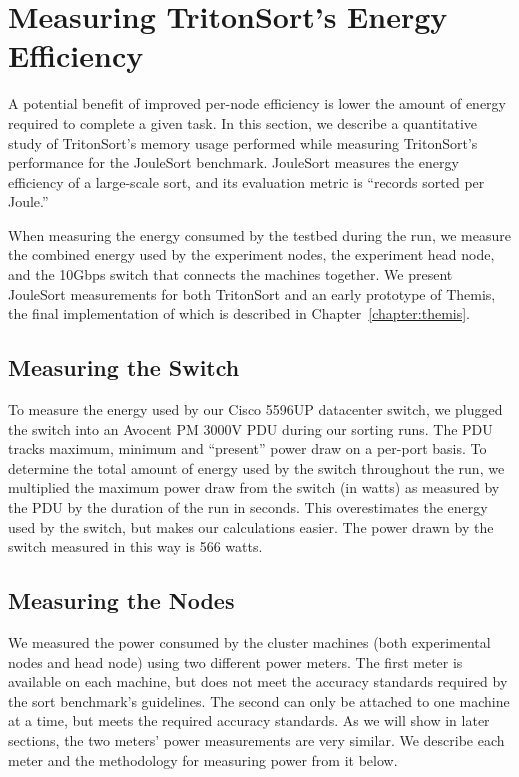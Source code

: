 \section{Measuring TritonSort's Energy Efficiency}

A potential benefit of improved per-node efficiency is lower the amount of
energy required to complete a given task. In this section, we describe a
quantitative study of TritonSort's memory usage performed while measuring
TritonSort's performance for the JouleSort benchmark. JouleSort measures the
energy efficiency of a large-scale sort, and its evaluation metric is ``records
sorted per Joule.''

When measuring the energy consumed by the testbed during the run, we measure
the combined energy used by the experiment nodes, the experiment head node, and
the 10Gbps switch that connects the machines together. We present JouleSort
measurements for both TritonSort and an early prototype of Themis, the final
implementation of which is described in Chapter~\ref{chapter:themis}.

\subsection{Measuring the Switch}
To measure the energy used by our Cisco 5596UP datacenter switch, we plugged the
switch into an Avocent PM 3000V PDU during our sorting runs. The PDU tracks
maximum, minimum and ``present'' power draw on a per-port basis. To determine
the total amount of energy used by the switch throughout the run, we multiplied
the maximum power draw from the switch (in watts) as measured by the PDU by the
duration of the run in seconds. This overestimates the energy used by the
switch, but makes our calculations easier. The power drawn by the switch
measured in this way is 566 watts.

\subsection{Measuring the Nodes}
We measured the power consumed by the cluster machines (both experimental nodes
and head node) using two different power meters. The first meter is available
on each machine, but does not meet the accuracy standards required by the
sort benchmark's guidelines. The second can only be attached to one machine at a
time, but meets the required accuracy standards. As we will show in later
sections, the two meters' power measurements are very similar. We describe each
meter and the methodology for measuring power from it below.

